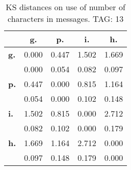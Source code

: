 \begin{table}[h!]
\begin{center}
\begin{tabular}{| l || c | c | c | c |}\hline
 & {\bf g.} & {\bf p.} & {\bf i.} & {\bf h.} \\\hline\hline
{\bf g.} & 0.000 & 0.447 & 1.502 & 1.669 \\
{\bf } & 0.000 & 0.054 & 0.082 & 0.097 \\\hline
{\bf p.} & 0.447 & 0.000 & 0.815 & 1.164 \\
{\bf } & 0.054 & 0.000 & 0.102 & 0.148 \\\hline
{\bf i.} & 1.502 & 0.815 & 0.000 & 2.712 \\
{\bf } & 0.082 & 0.102 & 0.000 & 0.179 \\\hline
{\bf h.} & 1.669 & 1.164 & 2.712 & 0.000 \\
{\bf } & 0.097 & 0.148 & 0.179 & 0.000 \\\hline
\end{tabular}
\caption{KS distances on use of number of characters in messages. TAG: 13}
\end{center}
\end{table}